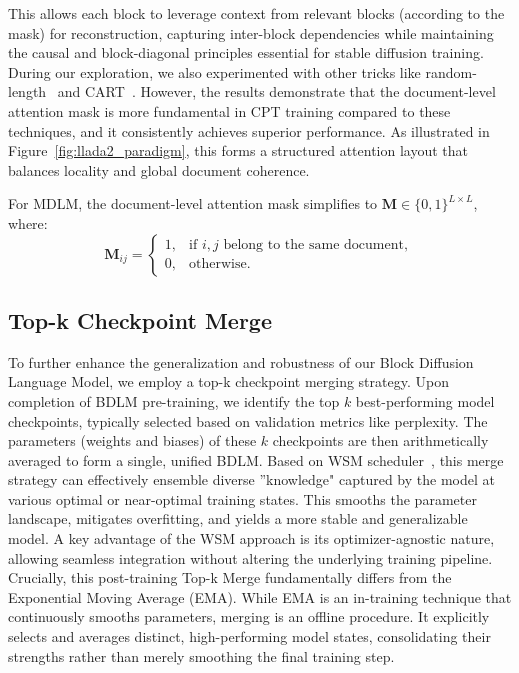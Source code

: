 This allows each block to leverage context from relevant blocks (according to the mask) for reconstruction, capturing inter-block dependencies while maintaining the causal and block-diagonal principles essential for stable diffusion training. During our exploration, we also experimented with other tricks like random-length~\citep{xie_dream-coder_2025} and CART~\citep{Dream7B2025}. However, the results demonstrate that the document-level attention mask is more fundamental in CPT training compared to these techniques, and it consistently achieves superior performance. As illustrated in Figure~\ref{fig:llada2_paradigm}, this forms a structured attention layout that balances locality and global document coherence.

For MDLM, the document-level attention mask simplifies to $\bm{M}\in\{0,1\}^{L\times L}$, where:
\begin{equation}
\bm{M}_{ij} = 
\begin{cases}
1, & \text{if $i,j$ belong to the same document}, \\
0, & \text{otherwise}.
\end{cases}
\end{equation}

\subsection{Top-k Checkpoint Merge}
To further enhance the generalization and robustness of our Block Diffusion Language Model, we employ a top-k checkpoint merging strategy.
Upon completion of BDLM pre-training, we identify the top $k$ best-performing model checkpoints, typically selected based on validation metrics like perplexity. The parameters (weights and biases) of these $k$ checkpoints are then arithmetically averaged to form a single, unified BDLM. Based on WSM scheduler~\citep{tian2025wsm}, this merge strategy can effectively ensemble diverse ''knowledge" captured by the model at various optimal or near-optimal training states. This smooths the parameter landscape, mitigates overfitting, and yields a more stable and generalizable model. A key advantage of the WSM approach is its optimizer-agnostic nature, allowing seamless integration without altering the underlying training pipeline.
Crucially, this post-training Top-k Merge fundamentally differs from the Exponential Moving Average (EMA). While EMA is an in-training technique that continuously smooths parameters, merging is an offline procedure. It explicitly selects and averages distinct, high-performing model states, consolidating their strengths rather than merely smoothing the final training step.
